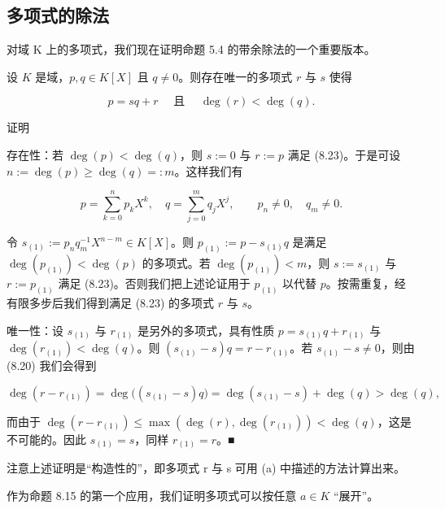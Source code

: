 \subsection*{多项式的除法}

对域 K 上的多项式，我们现在证明命题 5.4 的带余除法的一个重要版本。

\begin{proposition}

设 $K$ 是域，$p, q \in K[X]$ 且 $q \neq 0$。则存在唯一的多项式 $r$ 与 $s$ 使得

\begin{equation}
p=s q+r\quad\text{ 且 }\quad\deg(r)<\deg(q).
\end{equation}

证明

\begin{items}
\item

存在性：若  $ \deg(p) < \deg(q) $，则  $ s := 0 $ 与  $ r := p $ 满足 (8.23)。于是可设  $ n := \deg(p) \geq \deg(q) =: m $。这样我们有

\[
p=\sum_{k=0}^{n}p_{k}X^{k},\quad q=\sum_{j=0}^{m}q_{j}X^{j},\qquad p_{n}\neq0,\quad q_{m}\neq0.
\]

令 $s_{(1)} := p_n q_m^{-1} X^{n-m} \in K[X]$。则 $p_{(1)} := p - s_{(1)} q$ 是满足 $\deg(p_{(1)}) < \deg(p)$ 的多项式。若 $\deg(p_{(1)}) < m$，则 $s := s_{(1)}$ 与 $r := p_{(1)}$ 满足 (8.23)。否则我们把上述论证用于 $p_{(1)}$ 以代替 $p$。按需重复，经有限多步后我们得到满足 (8.23) 的多项式 $r$ 与 $s$。

\item

唯一性：设 $s_{(1)}$ 与 $r_{(1)}$ 是另外的多项式，具有性质 $p = s_{(1)}q + r_{(1)}$ 与 $\deg(r_{(1)}) < \deg(q)$。则 $(s_{(1)} - s)q = r - r_{(1)}$。若 $s_{(1)} - s \neq 0$，则由 (8.20) 我们会得到

\[
\deg(r-r_{(1)})=\deg\bigl((s_{(1)}-s)q\bigr)=\deg(s_{(1)}-s)+\deg(q)>\deg(q),
\]

而由于  $ \deg(r - r_{(1)}) \leq \max(\deg(r), \deg(r_{(1)})) < \deg(q) $，这是不可能的。因此  $ s_{(1)} = s $，同样  $ r_{(1)} = r $。■

\end{items}

\end{proposition}

注意上述证明是“构造性的”，即多项式 r 与 s 可用 (a) 中描述的方法计算出来。

作为命题 8.15 的第一个应用，我们证明多项式可以按任意  $ a \in K $ “展开”。

